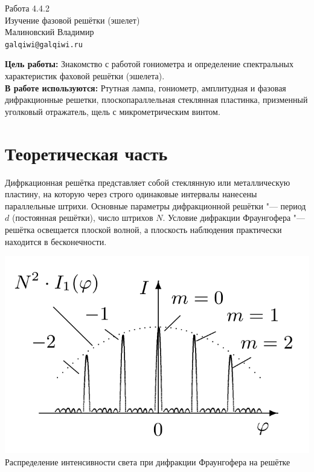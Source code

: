 



\begin{center}
  \LARGE{Работа 4.4.2}\\[0.2cm]
  \LARGE{Изучение фазовой решётки (эшелет)}\\[0.2cm]
  \large{Малиновский Владимир}\\[0.2cm]
  \normalsize{\texttt{galqiwi@galqiwi.ru}}
\end{center}

\textbf{Цель работы:} Знакомство с работой гониометра и определение спектральных характеристик фаховой решётки (эшелета).\\
\textbf{В работе используются:} Ртутная лампа, гониометр, амплитудная и фазовая дифракционные решетки, плоскопараллельная стеклянная пластинка, призменный уголковый отражатель, щель с микрометрическим винтом.\
\section*{Теоретическая часть}
Дифркационная решётка представляет собой стеклянную или металлическую пластину, на которую через строго одинаковые интервалы нанесены параллельные штрихи. Основные параметры дифракционной решётки "--- период $d$ (постоянная решётки), число штрихов $N$.
Условие дифракции Фраунгофера "--- решётка освещается плоской волной, а плоскость наблюдения практически находится в бесконечности.

\begin{center}
    \includegraphics[width = 1.0\linewidth]{4.4.2/1.png}
    {Распределение интенсивности света при дифракции Фраунгофера на решётке}
\end{center}

